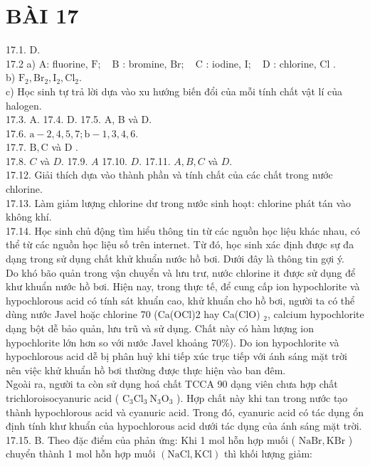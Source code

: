 \documentclass[10pt]{article}
\begin{document}
\section*{BÀI 17}
17.1. D.\\
17.2 a) A: fluorine, $\mathrm{F} ; \quad \mathrm{B}$ : bromine, $\mathrm{Br} ; \quad \mathrm{C}$ : iodine, $\mathrm{I} ; \quad \mathrm{D}$ : chlorine, Cl .\\
b) $\mathrm{F}_{2}, \mathrm{Br}_{2}, \mathrm{I}_{2}, \mathrm{Cl}_{2}$.\\
c) Học sinh tự trả lời dựa vào xu hướng biến đổi của mỗi tính chất vật lí của halogen.\\
17.3. A. 17.4. D. 17.5. A, B và D.\\
17.6. $\mathrm{a}-2,4,5,7 ; \mathrm{b}-1,3,4,6$.\\
17.7. $\mathrm{B}, \mathrm{C}$ và D .\\
17.8. $C$ và $D$. 17.9. $A$ 17.10. $D$. 17.11. $A, B, C$ và $D$.\\
17.12. Giải thích dựa vào thành phần và tính chất của các chất trong nước chlorine.\\
17.13. Làm giảm lượng chlorine dư trong nước sinh hoạt: chlorine phát tán vào không khí.\\
17.14. Học sinh chủ động tìm hiểu thông tin từ các nguồn học liệu khác nhau, có thể từ các nguồn học liệu số trên internet. Từ đó, học sinh xác định được sự đa dạng trong sử dụng chất khử khuẩn nước hồ bơi. Dưới đây là thông tin gợi ý.\\
Do khó bão quản trong vận chuyển và lưu trư, nước chlorine it được sử dụng để khư khuẩn nước hồ bơi. Hiện nay, trong thực tế, để cung cấp ion hypochlorite và hypochlorous acid có tính sát khuẩn cao, khử khuẩn cho hồ bơi, người ta có thể dùng nước Javel hoặc chlorine 70 (Ca(OCl)2 hay Ca(ClO) ${ }_{2}$, calcium hypochlorite dạng bột dễ bảo quản, lưu trũ và sử dụng. Chất này có hàm lượng ion hypochlorite lớn hơn so với nước Javel khoảng 70\%). Do ion hypochlorite và hypochlorous acid dễ bị phân huỷ khi tiếp xúc trục tiếp với ánh sáng mặt trời nên việc khử khuẩn hồ bơi thường được thực hiện vào ban đêm.\\
Ngoài ra, người ta còn sử dụng hoá chất TCCA 90 dạng viên chưa hợp chất trichloroisocyanuric acid ( $\mathrm{C}_{3} \mathrm{Cl}_{3} \mathrm{~N}_{3} \mathrm{O}_{3}$ ). Hợp chất này khi tan trong nước tạo thành hypochlorous acid và cyanuric acid. Trong đó, cyanuric acid có tác dụng ổn định tính khư khuẩn của hypochlorous acid dưới tác dụng của ánh sáng mặt trời.\\
17.15. B. Theo đặc điểm của phản ứng: Khi 1 mol hỗn hợp muối ( $\mathrm{NaBr}, \mathrm{KBr}$ ) chuyển thành 1 mol hỗn hợp muối $(\mathrm{NaCl}, \mathrm{KCl})$ thì khối lượng giảm:
\end{document}
